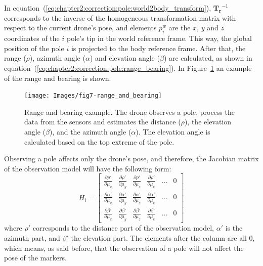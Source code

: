 In equation~(\ref{eq:chapter2:correction:pole:world2body_transform}), $\bm{T_r}^{-1}$ corresponds to the inverse of the homogeneous transformation matrix with respect to the current drone's pose, and elements $p_i^w$ are the $x$, $y$ and $z$ coordinates of the $i$ pole's tip in the world reference frame. This way, the global position of the pole $i$ is projected to the body reference frame. After that, the range ($\rho$), azimuth angle ($\alpha$) and elevation angle ($\beta$) are calculated, as shown in equation~(\ref{eq:chapter2:correction:pole:range_bearing}). In Figure~\ref{fig:chapter2:correction:poles:range_bearing} an example of the range and bearing is shown.
\begin{figure}[h]
    \centering
    \texttt{[image: Images/fig7-range\_and\_bearing]}
    \caption[Range and Bearing example]{Range and bearing example. The drone observes a pole, process the data from the sensors and estimates the distance ($\rho$), the elevation angle ($\beta$), and the azimuth angle ($\alpha$). The elevation angle is calculated based on the top extreme of the pole.}
    \label{fig:chapter2:correction:poles:range_bearing}
\end{figure}

Observing a pole affects only the drone's pose, and therefore, the Jacobian matrix of the observation model will have the following form:
\begin{equation}
    H_i = \begin{bmatrix}
        \frac{\partial \rho'}{\partial \mu_x} & \frac{\partial \rho'}{\partial \mu_y} & \frac{\partial \rho'}{\partial \mu_z} & \frac{\partial \rho'}{\partial \mu_{\psi}} & \dots & 0 \\
        \frac{\partial \alpha'}{\partial \mu_x} & \frac{\partial \alpha'}{\partial \mu_y} & \frac{\partial \alpha'}{\partial \mu_z} & \frac{\partial \alpha'}{\partial \mu_{\psi}} & \dots & 0 \\
        \frac{\partial \beta'}{\partial \mu_x} & \frac{\partial \beta'}{\partial \mu_y} & \frac{\partial \beta'}{\partial \mu_z} & \frac{\partial \beta'}{\partial \mu_{\psi}} & \dots & 0
    \end{bmatrix}
\end{equation}
where $\rho'$ corresponds to the distance part of the observation model, $\alpha'$ is the azimuth part, and $ \beta'$ the elevation part. The elements after the  column are all 0, which means, as said before, that the observation of a pole will not affect the pose of the markers.

